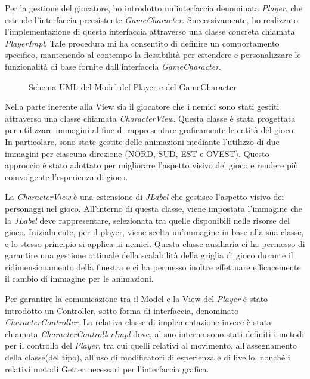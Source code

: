 \documentclass[a4paper,12pt]{report}
\begin{document}
Per la gestione del giocatore, ho introdotto un'interfaccia denominata \textit{Player}, che estende l'interfaccia preesistente \textit{GameCharacter}. Successivamente, ho realizzato l'implementazione di questa interfaccia attraverso una classe concreta chiamata \textit{PlayerImpl}. Tale procedura mi ha consentito di definire un comportamento specifico, mantenendo al contempo la flessibilità per estendere e personalizzare le funzionalità di base fornite dall'interfaccia \textit{GameCharacter}.

\begin{figure}[H]
	\centering
	
	\caption{Schema UML del Model del Player e del GameCharacter}
	\label{fig:the-exiled-player-uml}
\end{figure}

Nella parte inerente alla View sia il giocatore che i nemici sono stati gestiti attraverso una classe chiamata \textit{CharacterView}. Questa classe è stata progettata per utilizzare immagini al fine di rappresentare graficamente le entità del gioco. In particolare, sono state gestite delle animazioni mediante l'utilizzo di due immagini per ciascuna direzione (NORD, SUD, EST e OVEST). Questo approccio è stato adottato per migliorare l'aspetto visivo del gioco e rendere più coinvolgente l'esperienza di gioco. 

La \textit{CharacterView} è una estensione di \textit{JLabel} che gestisce l'aspetto visivo dei personaggi nel gioco. All'interno di questa classe, viene impostata l'immagine che la \textit{JLabel} deve rappresentare, selezionata tra quelle disponibili nelle risorse del gioco. Inizialmente, per il player, viene scelta un'immagine in base alla sua classe, e lo stesso principio si applica ai nemici. Questa classe ausiliaria ci ha permesso di garantire una gestione ottimale della scalabilità della griglia di gioco durante il ridimensionamento della finestra e ci ha permesso inoltre effettuare efficacemente il cambio di immagine per le animazioni.

Per garantire la comunicazione tra il Model e la View del \textit{Player} è stato introdotto un Controller, sotto forma di interfaccia, denominato \textit{CharacterController}. La relativa classe di implementazione invece è stata chiamata \textit{CharacterControllerImpl} dove, al suo interno sono stati definiti i metodi per il controllo del \textit{Player}, tra cui quelli relativi al movimento, all'assegnamento della classe(del tipo), all'uso di modificatori di esperienza e di livello, nonché i relativi metodi Getter necessari per l'interfaccia grafica.
\end{document}
